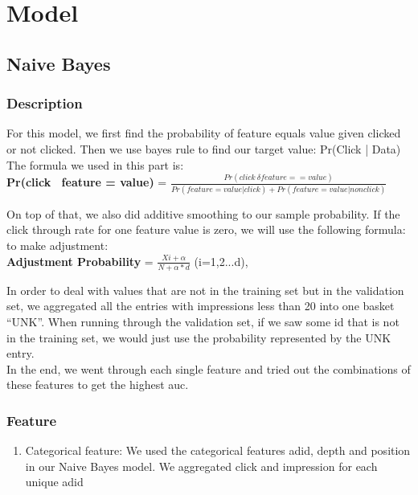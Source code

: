 \documentclass[12pt]{article}
\begin{document}
\section{Model}
\subsection{Naive Bayes}
\subsubsection{Description}
For this model, we first find the probability of feature equals value given clicked or not clicked. Then we use bayes rule to find our target value: Pr(Click | Data) 
The formula we used in this part is:\\

\vspace*{-10pt}
\textbf{Pr(click \textbar\   feature = value)} = $\frac{Pr(click \ \delta feature==value)}{Pr(feature = value | click)+Pr(feature = value | nonclick)}$ 
\setlength{\parskip}{5 pt}

On top of that, we also did additive smoothing to our sample probability. If the click through rate for one feature value is zero, we will use the following formula: to make adjustment:\\

\vspace*{-8pt}
\textbf{Adjustment Probability} = $\frac{Xi+ \alpha}{N + \alpha*d}$ (i=1,2...d),
\setlength{\parskip}{5 pt}

In order to deal with values that are not in the training set but in the validation set, we aggregated all the entries with impressions less than 20 into one basket “UNK”. When running through the validation set, if we saw some id that is not in the training set, we would just use the probability represented by the UNK entry.\\ 

\vspace*{-8pt}
In the end, we went through each single feature and tried out the combinations of these features to get the highest auc.
\vspace*{-10pt}

\subsubsection{Feature}
\begin{enumerate}
    \item Categorical feature: We used the categorical features adid, depth and position in our Naive Bayes  model. We aggregated click and impression for each unique adid

  \end{enumerate}%
\end{document}
